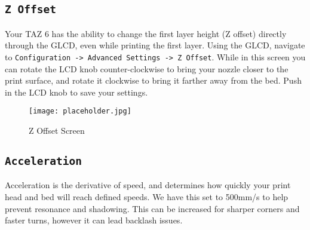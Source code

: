 \subsection{\texttt{Z Offset}}
Your TAZ 6 has the ability to change the first layer height (Z offset) directly through the GLCD, even while printing the first layer. Using the GLCD, navigate to \texttt{Configuration -> Advanced Settings -> Z Offset}. While in this screen you can rotate the LCD knob counter-clockwise to bring your nozzle closer to the print surface, and rotate it clockwise to bring it farther away from the bed. Push in the LCD knob to save your settings.

\begin{figure}[H]
\centering
\texttt{[image: placeholder.jpg]}
\caption{Z Offset Screen}
\label{fig:Z_offset_screen}
\end{figure}



\subsection{\texttt{Acceleration}}
Acceleration is the derivative of speed, and determines how quickly your print head and bed will reach defined speeds. We have this set to 500mm/s\textsuperscript{} to help prevent resonance and shadowing. This can be increased for sharper corners and faster turns, however it can lead backlash issues.


